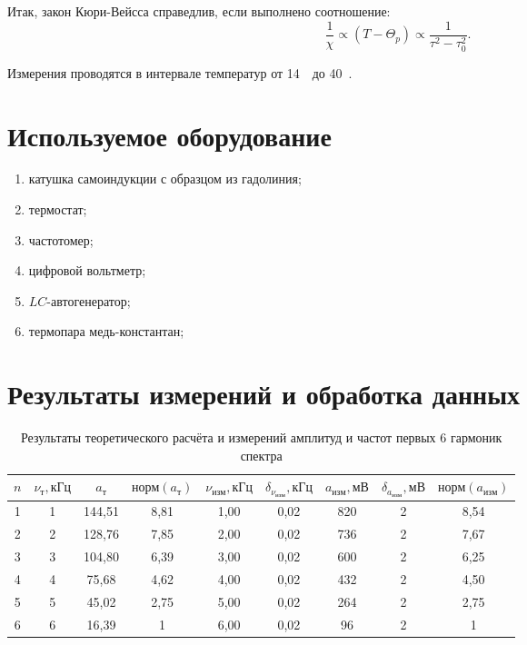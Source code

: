 \documentclass[a4paper, 12pt]{article}
\begin{document}
Итак, закон Кюри-Вейсса справедлив, если выполнено соотношение:
\begin{equation}
	\frac{1}{\chi} \propto (T-\Theta_p) \propto \frac{1}{\tau^2-\tau_0^2}.
\end{equation}

Измерения проводятся в интервале температур от 14~\textcelsius\, до 40~\textcelsius.

\section{Используемое оборудование}

\begin{enumerate}
    \item катушка самоиндукции с образцом из гадолиния;
    \item термостат;
    \item частотомер;
    \item цифровой вольтметр;
    \item $LC$-автогенератор;
    \item термопара медь-константан;
\end{enumerate}

\section{Результаты измерений и обработка данных}

\begin{table}[h!]
\begin{center}
\begin{tabular}{|c|c|c|c|c|c|c|c|c|}
\hline
$n$ & $\nu_{т}, кГц$ & $a_{т}$ & $норм(a_{т})$ & $\nu_{изм}, кГц$ & $\delta_{\nu_{изм}}, кГц$ & $a_{изм}, мВ$ & $\delta_{a_{изм}}, мВ$ & $норм(a_{изм})$ \\ \hline
1 & 1 & 144,51 & 8,81 & 1,00 & 0,02 & 820 & 2 & 8,54 \\ \hline
2 & 2 & 128,76 & 7,85 & 2,00 & 0,02 & 736 & 2 & 7,67 \\ \hline
3 & 3 & 104,80 & 6,39 & 3,00 & 0,02 & 600 & 2 & 6,25 \\ \hline
4 & 4 & 75,68 & 4,62 & 4,00 & 0,02 & 432 & 2 & 4,50 \\ \hline
5 & 5 & 45,02 & 2,75 & 5,00 & 0,02 & 264 & 2 & 2,75 \\ \hline
6 & 6 & 16,39 & 1 & 6,00 & 0,02 & 96 & 2 & 1 \\ \hline
\end{tabular}
\end{center}
\caption{Результаты теоретического расчёта и измерений амплитуд и частот первых 6 гармоник спектра}
\label{tab1}
\end{table}
\end{document}
